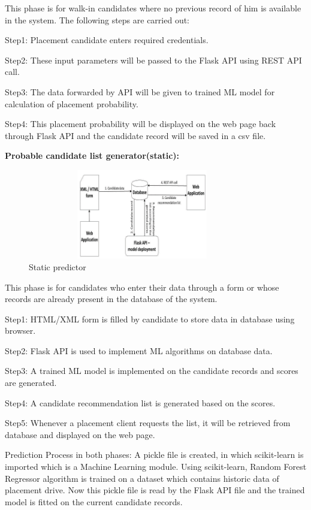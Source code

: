 \documentclass[12pt]{article}
\begin{document}
This phase is for walk-in candidates where no 
previous record of him is available in the system. The following steps are carried out:

Step1: Placement candidate enters required credentials.
 
Step2: These input parameters will be passed to the Flask API using REST API call. 

Step3: The data forwarded by API will be given to trained ML model for calculation of placement probability. 

Step4: This placement probability will be displayed on the web page back through Flask API and the candidate record will be saved in a csv file. 

\textbf{ Probable candidate list generator(static):}

\begin{figure}[H]
\begin{center}
 \includegraphics[width=10cm, height=3.9cm]{L5P2}
\caption{Static predictor }
\end{center}
\end{figure}

This phase is for candidates who enter their data 
through a form or whose records are already 
present in the database of the system. 

Step1: HTML/XML form is filled by candidate to store data in database using browser. 

Step2: Flask API is used to implement ML algorithms on database data. 

Step3: A trained ML model is implemented on the candidate records and scores are generated. 

Step4: A candidate recommendation list is generated based on the scores. 

Step5: Whenever a placement client requests the list, it will be retrieved from database and displayed on the web page. 

Prediction Process in both phases:
A pickle file is created, in which scikit-learn is 
imported which is a Machine Learning module. 
Using scikit-learn, Random Forest Regressor 
algorithm is trained on a dataset which contains 
historic data of placement drive. 
Now this pickle file is read by the Flask API file 
and the trained model is fitted on the current 
candidate records.
\end{document}
